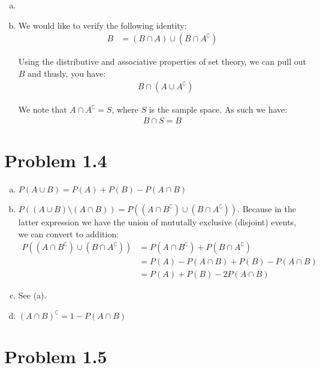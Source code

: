 \documentclass[11pt]{article}
\begin{document}
\begin{enumerate}[(a)]
    \item 
    \item We would like to verify the following identity:
        \begin{align*}
            B &= (B \cap A) \cup (B \cap A^{\complement})
        \end{align*}
        
        Using the distributive and associative properties of set theory, we can pull out $B$ and thusly, you have:
        \begin{align*}
            &B \cap (A \cup A^{\complement})
        \end{align*}
        
        We note that $A \cap A^{\complement} = S$, where $S$ is the sample space.  As such we have:
        \begin{align*}
            B \cap S = B
        \end{align*}
\end{enumerate}

\section*{Problem 1.4}

\begin{enumerate}[(a)]
    \item $P(A \cup B) = P(A) + P(B) - P(A \cap B)$
    \item $P((A \cup B) \setminus (A \cap B)) = P((A \cap B^{\complement}) \cup (B \cap A^{\complement}))$.  Because in the latter expression we have the union of mututally exclusive (disjoint) events, we can convert to addition:
        \begin{align*}
            P((A \cap B^{\complement}) \cup (B \cap A^{\complement})) &= P(A \cap B^{\complement}) + P(B \cap A^{\complement}) \\
            &= P(A) - P(A \cap B) + P(B) - P(A \cap B) \\
            &= P(A) + P(B) - 2 P(A \cap B)
        \end{align*}
    \item See (a).
    \item $(A \cap B)^{\complement} = 1 - P(A \cap B)$
\end{enumerate}

\section*{Problem 1.5}
\end{document}
